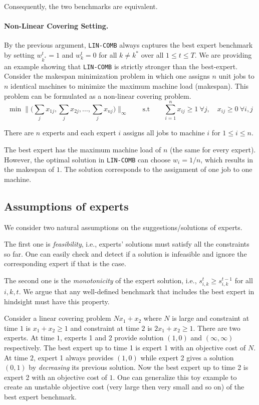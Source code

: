 Consequently, the two benchmarks are equivalent. 

\paragraph{Non-Linear Covering Setting.} By the previous argument, \texttt{LIN-COMB} always captures the best expert benchmark by setting 
$w_{k^{*}}^{t} = 1$ and $w_{k}^{t} = 0$ for all $k \neq k^{*}$ over all $1 \leq t \leq T$. We are providing an example showing that \texttt{LIN-COMB} is strictly stronger than 
the best-expert. Consider the makespan minimization problem in which one assigns $n$ unit jobs to $n$ identical machines to minimize the maximum machine load (makespan).   
This problem can be formulated as a non-linear covering problem.
$$
\min \biggl \| \biggl( \sum_{j} x_{1j}, \sum_{j} x_{2 j}, \ldots, \sum_{j} x_{n j} \biggr) \biggr \|_{\infty}
\qquad {\text{s.t}} \qquad
\sum_{i=1}^{n} x_{ij} \geq 1 ~\forall j, \quad x_{ij} \geq 0 ~\forall i,j
$$

There are $n$ experts and each expert $i$ assigns all jobs to machine $i$ for $1 \leq i \leq n$. 

The best expert has the maximum machine load of $n$ (the same for every expert). However, the optimal solution in \texttt{LIN-COMB} can choose $w_{i} = 1/n$, which results in the makespan of $1$. The solution corresponds to the assignment of one job to one machine.  


\subsection{Assumptions of experts}
We consider two natural assumptions on the suggestions/solutions of experts. 

The first one is \emph{feasibility}, i.e., experts' solutions must satisfy all the constraints so far. One can easily check and detect if a solution is infeasible and ignore the corresponding expert if that is the case. 

The second one is the \emph{monotonicity} of the expert solution, i.e., $s_{i,k}^{t} \geq s_{i,k}^{t-1}$ for all $i,k,t$. We argue that any well-defined benchmark that includes the best expert in hindsight must have this property.

Consider a linear covering problem $Nx_{1} + x_{2}$ where $N$ is large and constraint at time $1$ is $x_{1} + x_{2} \geq 1$ and constraint at time $2$ is $2x_{1} + x_{2} \geq 1$. 
There are two experts. 
At time $1$, experts 1 and 2 provide solution $(1,0)$ and $(\infty, \infty)$ respectively. 
The best expert up to time 1 is expert 1 with an objective cost of $N$. 
At time $2$, expert 1 always provides $(1,0)$ while expert 2 gives a solution $(0,1)$ by \emph{decreasing} its previous solution.  
Now the best expert up to time 2 is expert 2 with an objective cost of $1$. 
One can generalize this toy example to create an unstable objective cost (very large then very small and so on) of the best expert benchmark.


